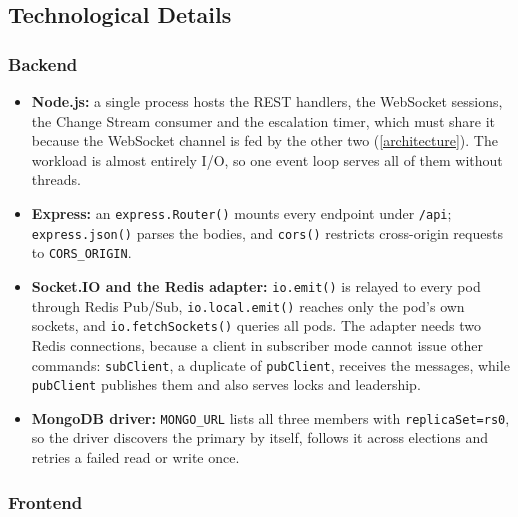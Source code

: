 \documentclass{scrartcl}
\begin{document}
\subsection{Technological Details}\label{technological-details}

\subsubsection{Backend}

\begin{itemize}
  \item \textbf{Node.js:} a single process hosts the REST handlers, the WebSocket sessions, the Change Stream consumer and the escalation timer, which must share it because the WebSocket channel is fed by the other two (\cref{architecture}). The workload is almost entirely I/O, so one event loop serves all of them without threads.
  \item \textbf{Express:} an \texttt{express.Router()} mounts every endpoint under \texttt{/api}; \texttt{express.json()} parses the bodies, and \texttt{cors()} restricts cross-origin requests to \texttt{CORS\_ORIGIN}.
  \item \textbf{Socket.IO and the Redis adapter:} \texttt{io.emit()} is relayed to every pod through Redis Pub/Sub, \texttt{io.local.emit()} reaches only the pod's own sockets, and \texttt{io.fetchSockets()} queries all pods. The adapter needs two Redis connections, because a client in subscriber mode cannot issue other commands: \texttt{subClient}, a duplicate of \texttt{pubClient}, receives the messages, while \texttt{pubClient} publishes them and also serves locks and leadership.
  \item \textbf{MongoDB driver:} \texttt{MONGO\_URL} lists all three members with \texttt{replicaSet=rs0}, so the driver discovers the primary by itself, follows it across elections and retries a failed read or write once.
\end{itemize}

\subsubsection{Frontend}
\end{document}
